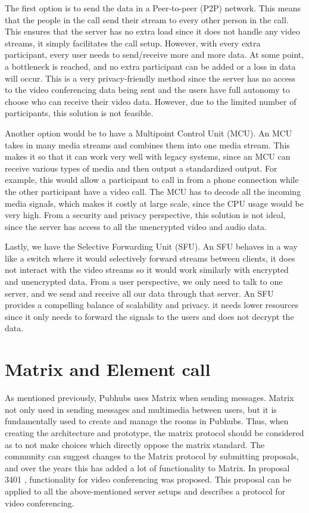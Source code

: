 \documentclass[11pt,a4paper]{article}
\begin{document}
The first option is to send the data in a Peer-to-peer (P2P) network. This means that the people in the call send their stream to every other person in the call. This ensures that the server has no extra load since it does not handle any video streams, it simply facilitates the call setup. However, with every extra participant, every user needs to send/receive more and more data. At some point, a bottleneck is reached, and no extra participant can be added or a loss in data will occur. This is a very privacy-friendly method since the server has no access to the video conferencing data being sent and the users have full autonomy to choose who can receive their video data. However, due to the limited number of participants, this solution is not feasible.

Another option would be to have a Multipoint Control Unit (MCU). An MCU takes in many media streams and combines them into one media stream. This makes it so that it can work very well with legacy systems, since an MCU can receive various types of media and then output a standardized output. For example, this would allow a participant to call in from a phone connection while the other participant have a video call. The MCU has to decode all the incoming media signals, which makes it costly at large scale, since the CPU usage would be very high. From a security and privacy perspective, this solution is not ideal, since the server has access to all the unencrypted video and audio data. 

Lastly, we have the Selective Forwarding Unit (SFU). An SFU behaves in a way like a switch where it would selectively forward streams between clients, it does not interact with the video streams so it would work similarly with encrypted and unencrypted data. From a user perspective, we only need to talk to one server, and we send and receive all our data through that server. An SFU provides a compelling balance of scalability and privacy. it needs lower resources since it only needs to forward the signals to the users and does not decrypt the data. 

\section{Matrix and Element call}
As mentioned previously, Pubhubs uses Matrix when sending messages. Matrix not only used in sending messages and multimedia between users, but it is fundamentally used to create and manage the rooms in Pubhubs. Thus, when creating the architecture and prototype, the matrix protocol should be considered as to not make choices which directly oppose the matrix standard. The community can suggest changes to the Matrix protocol by submitting proposals, and over the years this has added a lot of functionality to Matrix. In proposal 3401 \cite{MATRIX_VIDEO_CALL_PROP}, functionality for video conferencing was proposed. This proposal can be applied to all the above-mentioned server setups and describes a protocol for video conferencing. 
\end{document}

